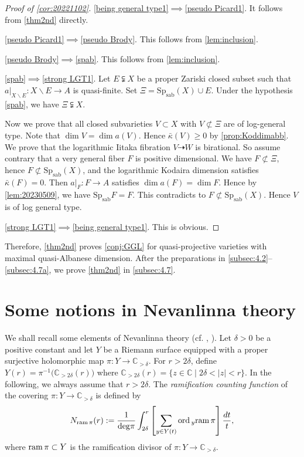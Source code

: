 \documentclass[11pt,english]{smfart}
\theoremstyle{plain}
\theoremstyle{definition}
\theoremstyle{remark}
\numberwithin{equation}{section}
\theoremstyle{plain}
\newcommand{\bC}{\mathbb{C}}
\newcommand{\Spab}{\mathrm{Sp}_{\mathrm{sab}}}
\newcommand{\ord}{{\rm ord}\,}
\newcommand{\ram}{{\rm ram}\,}
\begin{document}
\begin{proof}[Proof of \cref{cor:20221102}]  \ref{being general type1}$\implies$\ref{pseudo Picard1}.  It follows from \cref{thm2nd} directly. 
	
	\ref{pseudo Picard1}$\implies$\ref{pseudo Brody}. 	This follows from \cref{lem:inclusion}.
	
	
	\ref{pseudo Brody}$\implies$\ref{spab}.
	This follows from \cref{lem:inclusion}.
	
	\ref{spab}$\implies$\ref{strong LGT1}.  
	Let $E\subsetneqq X$ be a proper Zariski closed subset such that $a|_{X\backslash E}:X\backslash E\to A$ is quasi-finite.
	Set $\Xi=\Spab(X)\cup E$.
	Under the hypothesis  \ref{spab}, we have $\Xi\subsetneqq X$. 
	
	Now we prove that all closed subvarieties $V\subset X$ with $V\not\subset \Xi$ are of log-general type.
	Note that $\dim V=\dim a(V)$. 
	Hence $\bar{\kappa}(V)\geq 0$ by \cref{prop:Koddimabb}. 
	We prove that the logarithmic Iitaka fibration $V\dashrightarrow W$ is birational.
	So assume contrary that a very general fiber $F$ is positive dimensional.
	We have $F\not\subset \Xi$, hence $F\not\subset \Spab(X)$, and the logarithmic Kodaira dimension satisfies $\bar{\kappa}(F)=0$.
	Then $a|_F:F\to A$ satisfies $\dim a(F)=\dim F$. 
	Hence by \cref{lem:20230509}, we have $\Spab{F}=F$.
	This contradicts to $F\not\subset \Spab(X)$.
	Hence $V$ is of log general type. 
	
	\ref{strong LGT1}$\implies$\ref{being general type1}.  This is obvious. 
\end{proof} 
Therefore, \cref{thm2nd}   proves  \cref{conj:GGL} for quasi-projective varieties with maximal quasi-Albanese dimension. 
After the preparations in \cref{subsec:4.2}–\cref{subsec:4.7a}, we prove \cref{thm2nd} in \cref{subsec:4.7}.





	\section{Some notions in Nevanlinna theory}\label{subsec:notion Nevanlinna}
	We shall recall some elements of Nevanlinna theory (cf. \cite{NW13}, \cite{yamanoi2015kobayashi}).  
	Let $\delta>0$ be a positive constant and let $Y$ be a Riemann surface equipped with a proper surjective holomorphic map 
$\pi:Y\to\mathbb C_{>\delta}$.
	For $r>2\delta$, define
	$
	Y(r)=\pi^{-1}\big( \mathbb C_{>2\delta}(r) \big)
	$ 
	where $\mathbb C_{>2\delta}(r)=\{z\in \bC\mid  2\delta<|z|<r\}$. 
	In the following, we always assume that $r>2\delta$.
	The \emph{ramification counting function} of the covering $\pi:Y\to  \bC_{>\delta}$ is defined by
	$$
	N_{{\rm ram}\,  \pi}(r):=\frac{1}{{\rm deg} \pi}\int_{2\delta}^{r}\left[\sum_{y\in {Y}(t)} \ord_y \ram \pi \right]\frac{dt}{t},
	$$ 
	where $\ram \pi\subset Y$ is the ramification divisor of $\pi:Y\to\mathbb C_{>\delta}$.
	
\end{document}
